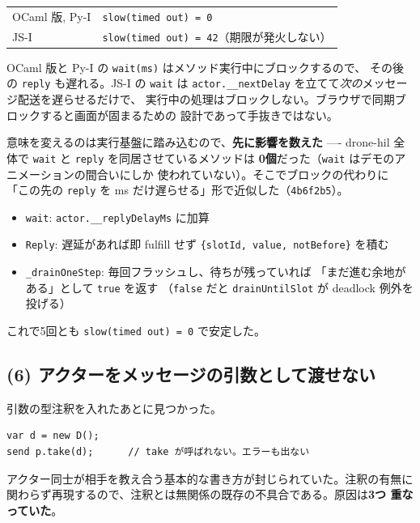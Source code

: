 \documentclass[11pt,a4paper]{ltjsarticle}
\begin{document}
\begin{center}
\small
\begin{tabular}{@{}ll@{}}
\toprule
OCaml 版, Py-I & \texttt{slow(timed out) = 0} \\
JS-I & \texttt{slow(timed out) = 42}（期限が発火しない）\\
\bottomrule
\end{tabular}
\end{center}

OCaml 版と Py-I の \texttt{wait(ms)} はメソッド実行中にブロックするので、
その後の \texttt{reply} も遅れる。JS-I の \texttt{wait} は
\texttt{actor.\_\_nextDelay} を立てて\emph{次の}メッセージ配送を遅らせるだけで、
実行中の処理はブロックしない。ブラウザで同期ブロックすると画面が固まるための
設計であって手抜きではない。

意味を変えるのは実行基盤に踏み込むので、\textbf{先に影響を数えた} ----
drone-hil 全体で \texttt{wait} と \texttt{reply} を同居させているメソッドは
\textbf{0個}だった（\texttt{wait} はデモのアニメーションの間合いにしか
使われていない）。そこでブロックの代わりに
「この先の \texttt{reply} を ms だけ遅らせる」形で近似した（\texttt{4b6f2b5}）。

\begin{itemize}
\item \texttt{wait}: \texttt{actor.\_\_replyDelayMs} に加算
\item \texttt{Reply}: 遅延があれば即 fulfill せず
      \verb|{slotId, value, notBefore}| を積む
\item \texttt{\_drainOneStep}: 毎回フラッシュし、待ちが残っていれば
      「まだ進む余地がある」として \texttt{true} を返す
      （\texttt{false} だと \texttt{drainUntilSlot} が deadlock 例外を投げる）
\end{itemize}

これで5回とも \texttt{slow(timed out) = 0} で安定した。

\subsection{(6) アクターをメッセージの引数として渡せない}
\label{sec:actorarg}

引数の型注釈を入れたあとに見つかった。

\begin{lstlisting}[language=AIPL]
var d = new D();
send p.take(d);      // take が呼ばれない。エラーも出ない
\end{lstlisting}

アクター同士が相手を教え合う基本的な書き方が封じられていた。注釈の有無に
関わらず再現するので、注釈とは無関係の既存の不具合である。原因は\textbf{3つ
重なっていた}。
\end{document}
